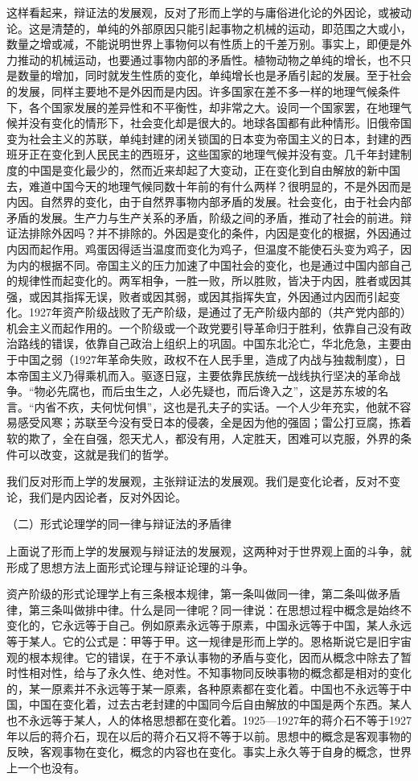 \documentclass[UTF8, 12pt, a4paper]{ctexrep}
\begin{document}
这样看起来，辩证法的发展观，反对了形而上学的与庸俗进化论的外因论，或被动论。这是清楚的，单纯的外部原因只能引起事物之机械的运动，即范围之大或小，数量之增或减，不能说明世界上事物何以有性质上的千差万别。事实上，即便是外力推动的机械运动，也要通过事物内部的矛盾性。植物动物之单纯的增长，也不只是数量的增加，同时就发生性质的变化，单纯增长也是矛盾引起的发展。至于社会的发展，同样主要地不是外因而是内因。许多国家在差不多一样的地理气候条件下，各个国家发展的差异性和不平衡性，却非常之大。设同一个国家罢，在地理气候并没有变化的情形下，社会变化却是很大的。地球各国都有此种情形。旧俄帝国变为社会主义的苏联，单纯封建的闭关锁国的日本变为帝国主义的日本，封建的西班牙正在变化到人民民主的西班牙，这些国家的地理气候并没有变。几千年封建制度的中国是变化最少的，然而近来却起了大变动，正在变化到自由解放的新中国去，难道中国今天的地理气候同数十年前的有什么两样？很明显的，不是外因而是内因。自然界的变化，由于自然界事物内部矛盾的发展。社会变化，由于社会内部矛盾的发展。生产力与生产关系的矛盾，阶级之间的矛盾，推动了社会的前进。辩证法排除外因吗？并不排除的。外因是变化的条件，内因是变化的根据，外因通过内因而起作用。鸡蛋因得适当温度而变化为鸡子，但温度不能使石头变为鸡子，因为内的根据不同。帝国主义的压力加速了中国社会的变化，也是通过中国内部自己的规律性而起变化的。两军相争，一胜一败，所以胜败，皆决于内因，胜者或因其强，或因其指挥无误，败者或因其弱，或因其指挥失宜，外因通过内因而引起变化。1927年资产阶级战败了无产阶级，是通过了无产阶级内部的（共产党内部的）机会主义而起作用的。一个阶级或一个政党要引导革命归于胜利，依靠自己没有政治路线的错误，依靠自己政治上组织上的巩固。中国东北沦亡，华北危急，主要由于中国之弱（1927年革命失败，政权不在人民手里，造成了内战与独裁制度），日本帝国主义乃得乘机而入。驱逐日寇，主要依靠民族统一战线执行坚决的革命战争。“物必先腐也，而后虫生之，人必先疑也，而后谗入之”，这是苏东坡的名言。“内省不疚，夫何忧何惧”，这也是孔夫子的实话。一个人少年充实，他就不容易感受风寒；苏联至今没有受日本的侵袭，全是因为他的强固；雷公打豆腐，拣着软的欺了，全在自强，怨天尤人，都没有用，人定胜天，困难可以克服，外界的条件可以改变，这就是我们的哲学。

我们反对形而上学的发展观，主张辩证法的发展观。我们是变化论者，反对不变论，我们是内因论者，反对外因论。

（二）形式论理学的同一律与辩证法的矛盾律

上面说了形而上学的发展观与辩证法的发展观，这两种对于世界观上面的斗争，就形成了思想方法上面形式论理与辩证论理的斗争。

资产阶级的形式论理学上有三条根本规律，第一条叫做同一律，第二条叫做矛盾律，第三条叫做排中律。什么是同一律呢？同一律说：在思想过程中概念是始终不变化的，它永远等于自己。例如原素永远等于原素，中国永远等于中国，某人永远等于某人。它的公式是：甲等于甲。这一规律是形而上学的。恩格斯说它是旧宇宙观的根本规律。它的错误，在于不承认事物的矛盾与变化，因而从概念中除去了暂时性相对性，给与了永久性、绝对性。不知事物同反映事物的概念都是相对的变化的，某一原素并不永远等于某一原素，各种原素都在变化着。中国也不永远等于中国，中国在变化着，过去古老封建的中国同今后自由解放的中国是两个东西。某人也不永远等于某人，人的体格思想都在变化着。1925—1927年的蒋介石不等于1927年以后的蒋介石，现在以后的蒋介石又将不等于以前。思想中的概念是客观事物的反映，客观事物在变化，概念的内容也在变化。事实上永久等于自身的概念，世界上一个也没有。
\end{document}
